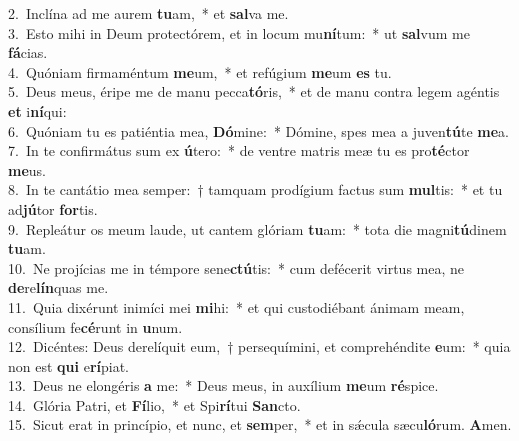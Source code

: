 {2.~}Inclína ad me aurem \textbf{tu}am,~* et \textbf{sal}va me.\\
{3.~}Esto mihi in Deum protectórem, et in locum mu\textbf{ní}tum:~* ut \textbf{sal}vum me \textbf{fá}cias.\\
{4.~}Quóniam firmaméntum \textbf{me}um,~* et refúgium \textbf{me}um \textbf{es} tu.\\
{5.~}Deus meus, éripe me de manu pecca\textbf{tó}ris,~* et de manu contra legem agéntis \textbf{et} i\textbf{ní}qui:\\
{6.~}Quóniam tu es patiéntia mea, \textbf{Dó}mine:~* Dómine, spes mea a juven\textbf{tú}te \textbf{me}a.\\
{7.~}In te confirmátus sum ex \textbf{ú}tero:~* de ventre matris meæ tu es pro\textbf{té}ctor \textbf{me}us.\\
{8.~}In te cantátio mea semper:~† tamquam prodígium factus sum \textbf{mul}tis:~* et tu ad\textbf{jú}tor \textbf{for}tis.\\
{9.~}Repleátur os meum laude, ut cantem glóriam \textbf{tu}am:~* tota die magni\textbf{tú}dinem \textbf{tu}am.\\
{10.~}Ne projícias me in témpore sene\textbf{ctú}tis:~* cum defécerit virtus mea, ne \textbf{de}re\textbf{lín}quas me.\\
{11.~}Quia dixérunt inimíci mei \textbf{mi}hi:~* et qui custodiébant ánimam meam, consílium fe\textbf{cé}runt in \textbf{u}num.\\
{12.~}Dicéntes: Deus derelíquit eum,~† persequímini, et comprehéndite \textbf{e}um:~* quia non est \textbf{qui} e\textbf{rí}piat.\\
{13.~}Deus ne elongéris \textbf{a} me:~* Deus meus, in auxílium \textbf{me}um \textbf{ré}spice.\\
{14.~}Glória Patri, et \textbf{Fí}lio,~* et Spi\textbf{rí}tui \textbf{San}cto.\\
{15.~}Sicut erat in princípio, et nunc, et \textbf{sem}per,~* et in sǽcula sæcu\textbf{ló}rum. \textbf{A}men.\\
